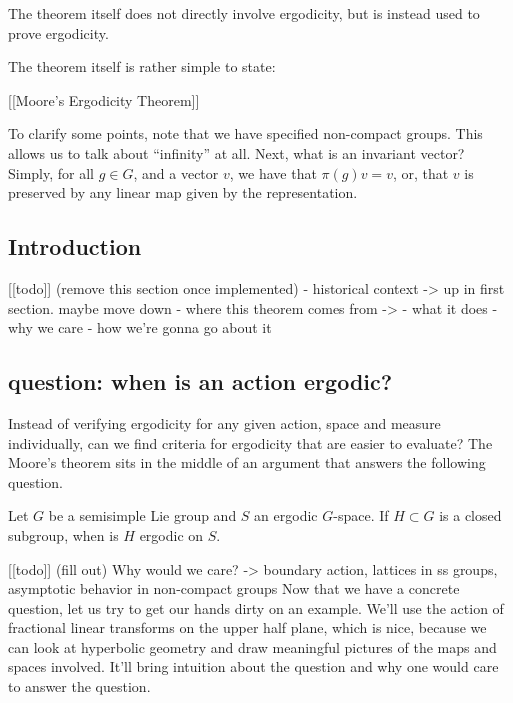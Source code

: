 \documentclass[
]{article}
\begin{document}
The theorem itself does not directly involve ergodicity, but is instead
used to prove ergodicity.

The theorem itself is rather simple to state:

{[}{[}Moore's Ergodicity Theorem{]}{]}

To clarify some points, note that we have specified non-compact groups.
This allows us to talk about ``infinity'' at all. Next, what is an
invariant vector? Simply, for all \(g\in G\), and a vector \(v\), we
have that \(\pi(g)v = v\), or, that \(v\) is preserved by any linear map
given by the representation.

\hypertarget{introduction}{%
\subsection{Introduction}\label{introduction}}

{[}{[}todo{]}{]} (remove this section once implemented) - historical
context -\textgreater{} up in first section. maybe move down - where
this theorem comes from -\textgreater{} \cite{howe79} - what it does -
why we care - how we're gonna go about it

\hypertarget{question-when-is-an-action-ergodic}{%
\subsection{question: when is an action
ergodic?}\label{question-when-is-an-action-ergodic}}

Instead of verifying ergodicity for any given action, space and measure
individually, can we find criteria for ergodicity that are easier to
evaluate? The Moore's theorem sits in the middle of an argument that
answers the following question.

Let \(G\) be a semisimple Lie group and \(S\) an ergodic \(G\)-space. If
\(H\subset G\) is a closed subgroup, when is \(H\) ergodic on \(S\).

{[}{[}todo{]}{]} (fill out) Why would we care? -\textgreater{} boundary
action, lattices in ss groups, asymptotic behavior in non-compact groups
\cite{howe79}
Now that we have a concrete question, let us try to get our hands dirty
on an example. We'll use the action of fractional linear transforms on
the upper half plane, which is nice, because we can look at hyperbolic
geometry and draw meaningful pictures of the maps and spaces involved.
It'll bring intuition about the question and why one would care to
answer the question.
\end{document}
